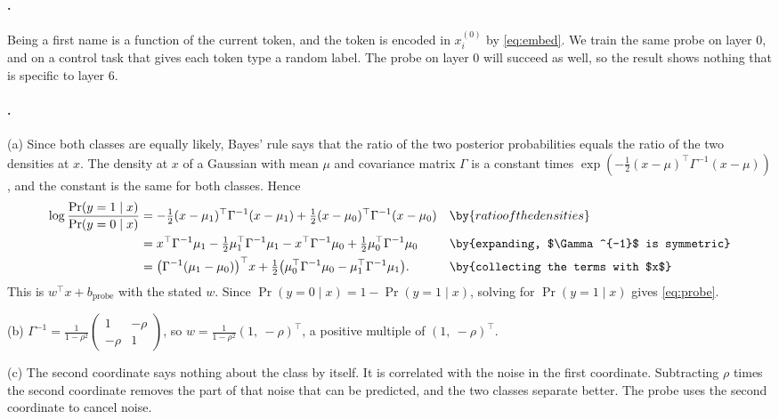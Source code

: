 {\paragraph{.}
Being a first name is a function of the current token, and the token is encoded in $x_i^{(0)}$ by
\eqref{eq:embed}. We train the same probe on layer $0$, and on a control task that gives each token type a random
label. The probe on layer $0$ will succeed as well, so the result shows nothing that is specific to layer 6.

\paragraph{.}
(a) Since both classes are equally likely, Bayes' rule says that the ratio of the two posterior probabilities
equals the ratio of the two densities at $x$. The density at $x$ of a Gaussian with mean $\mu$ and covariance matrix $\Gamma$ is a constant times
$\exp(-\tfrac12(x-\mu)^\top\Gamma^{-1}(x-\mu))$, and the constant is the same for both classes. Hence
\begin{align*}
\log\frac{\Pr(y=1\mid x)}{\Pr(y=0\mid x)}
&= -\tfrac12(x-\mu_1)^\top\Gamma^{-1}(x-\mu_1)+\tfrac12(x-\mu_0)^\top\Gamma^{-1}(x-\mu_0) && \by{ratio of the densities}\\
&= x^\top\Gamma^{-1}\mu_1-\tfrac12\mu_1^\top\Gamma^{-1}\mu_1-x^\top\Gamma^{-1}\mu_0+\tfrac12\mu_0^\top\Gamma^{-1}\mu_0 && \by{expanding, $\Gamma^{-1}$ is symmetric}\\
&= \big(\Gamma^{-1}(\mu_1-\mu_0)\big)^\top x+\tfrac12\big(\mu_0^\top\Gamma^{-1}\mu_0-\mu_1^\top\Gamma^{-1}\mu_1\big). && \by{collecting the terms with $x$}
\end{align*}
This is $w^\top x+b_{\mathrm{probe}}$ with the stated $w$. Since $\Pr(y=0\mid x)=1-\Pr(y=1\mid x)$, solving for
$\Pr(y=1\mid x)$ gives \eqref{eq:probe}.

(b) $\Gamma^{-1}=\frac{1}{1-\rho^2}\begin{pmatrix}1&-\rho\\-\rho&1\end{pmatrix}$, so
$w=\frac{1}{1-\rho^2}(1,\ -\rho)^\top$, a positive multiple of $(1,\ -\rho)^\top$.

(c) The second coordinate says nothing about the class by itself. It is correlated with the noise in the first
coordinate. Subtracting $\rho$ times the second coordinate removes the part of that noise that can be predicted,
and the two classes separate better. The probe uses the second coordinate to cancel noise.

}
